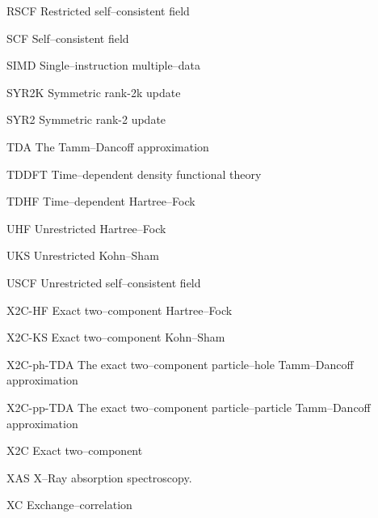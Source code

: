 \begin{glossary}
  \item[RSCF]        Restricted self--consistent field
  \item[SCF]         Self--consistent field
  \item[SIMD]        Single--instruction multiple--data
  \item[SYR2K]       Symmetric rank-2k update
  \item[SYR2]        Symmetric rank-2 update
  \item[TDA]         The Tamm--Dancoff approximation
  \item[TDDFT]       Time--dependent density functional theory
  \item[TDHF]        Time--dependent Hartree--Fock
  \item[UHF]         Unrestricted Hartree--Fock
  \item[UKS]         Unrestricted Kohn--Sham
  \item[USCF]        Unrestricted self--consistent field
  \item[X2C-HF]      Exact two--component Hartree--Fock
  \item[X2C-KS]      Exact two--component Kohn--Sham
  \item[X2C-ph-TDA]  The exact two--component particle--hole Tamm--Dancoff approximation
  \item[X2C-pp-TDA]  The exact two--component particle--particle Tamm--Dancoff approximation
  \item[X2C]         Exact two--component
  \item[XAS]         X--Ray absorption spectroscopy.
  \item[XC]          Exchange--correlation
\end{glossary}




